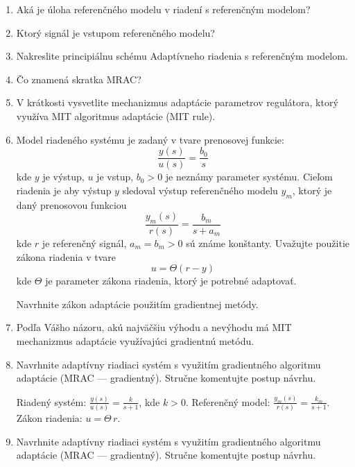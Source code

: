 \documentclass[a4paper, 10pt, ]{article}
\begin{document}
\begin{enumerate}[leftmargin=0pt, labelsep=4mm, itemsep=0pt]

	\item Aká je úloha referenčného modelu v riadení s referenčným modelom?
	\item Ktorý signál je vstupom referenčného modelu?
	\item Nakreslite principiálnu schému Adaptívneho riadenia s referenčným modelom.
	\item Čo znamená skratka MRAC?

	\item V krátkosti vysvetlite mechanizmus adaptácie parametrov regulátora, ktorý využíva MIT algoritmus adaptácie (MIT rule).

	\item Model riadeného systému je zadaný v tvare prenosovej funkcie:
	\begin{equation*}
		\frac{y(s)}{u(s)} = \frac{b_0}{s}
	\end{equation*}
	kde $y$ je výstup, $u$ je vstup, $b_0 > 0$ je neznámy parameter systému. Cieľom riadenia je aby výstup $y$ sledoval výstup referenčného modelu $y_m$, ktorý je daný prenosovou funkciou
	\begin{equation*}
			\frac{y_m(s)}{r(s)} = \frac{b_m}{s + a_m}
	\end{equation*}
	kde $r$ je referenčný signál, $a_m = b_m > 0$ sú známe konštanty. Uvažujte použitie zákona riadenia v tvare
	\begin{equation*}
		u = \Theta (r - y)
	\end{equation*}
	kde $\Theta$ je parameter zákona riadenia, ktorý je potrebné adaptovať.

	Navrhnite zákon adaptácie použitím gradientnej metódy.

	\item Podľa Vášho názoru, akú najväčšiu výhodu a nevýhodu má MIT mechanizmus adaptácie využívajúci gradientnú metódu.


	\item Navrhnite adaptívny riadiaci systém s využitím gradientného algoritmu adaptácie (MRAC --- gradientný). Stručne komentujte postup návrhu.

	Riadený systém: $\displaystyle \frac{y(s)}{u(s)} = \frac{k}{s + 1}$, kde $k>0$. Referenčný model: $\displaystyle \frac{y_m(s)}{r(s)} = \frac{k_m}{s + 1}$. Zákon riadenia: $u = \Theta\,r$.


	\item Navrhnite adaptívny riadiaci systém s využitím gradientného algoritmu adaptácie (MRAC --- gradientný). Stručne komentujte postup návrhu.


\end{enumerate}
\end{document}
